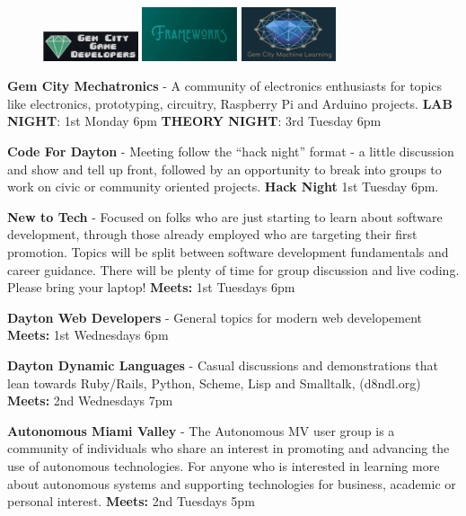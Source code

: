 \documentclass[14pt]{extarticle}
\begin{document}
\begin{figure}
    \includegraphics[width=1.1in]{img/GemCityGameDevelopers.png}
  \includegraphics[width=1.1in]{img/Frameworks.png}
  \includegraphics[width=1.1in]{img/gem_city_social.png}
\end{figure}

\textbf{Gem City Mechatronics} - A community of electronics enthusiasts
for topics like electronics, prototyping, circuitry, Raspberry Pi and
Arduino projects. \textbf{LAB NIGHT}: 1st Monday 6pm \textbf{THEORY
NIGHT}: 3rd Tuesday 6pm

\textbf{Code For Dayton} - Meeting follow the ``hack night'' format - a
little discussion and show and tell up front, followed by an opportunity
to break into groups to work on civic or community oriented projects.
\textbf{Hack Night} 1st Tuesday 6pm.

\textbf{New to Tech} - Focused on folks who are just starting to learn
about software development, through those already employed who are
targeting their first promotion. Topics will be split between software
development fundamentals and career guidance. There will be plenty of
time for group discussion and live coding. Please bring your laptop!
\textbf{Meets:} 1st Tuesdays 6pm

\textbf{Dayton Web Developers} - General topics for modern web
developement \textbf{Meets:} 1st Wednesdays 6pm

\textbf{Dayton Dynamic Languages} - Casual discussions and
demonstrations that lean towards Ruby/Rails, Python, Scheme, Lisp and
Smalltalk, (d8ndl.org) \textbf{Meets:} 2nd Wednesdays 7pm

\textbf{Autonomous Miami Valley} - The Autonomous MV user group is a
community of individuals who share an interest in promoting and
advancing the use of autonomous technologies. For anyone who is
interested in learning more about autonomous systems and supporting
technologies for business, academic or personal interest.
\textbf{Meets:} 2nd Tuesdays 5pm
\end{document}
